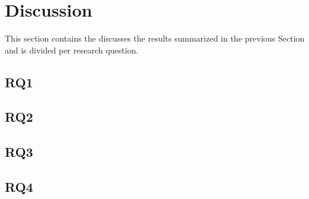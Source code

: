 \chapter{Discussion}

This section contains the discusses the results summarized in the previous Section and is divided per research question.

\section{RQ1}

\section{RQ2}

\section{RQ3}

\section{RQ4}

